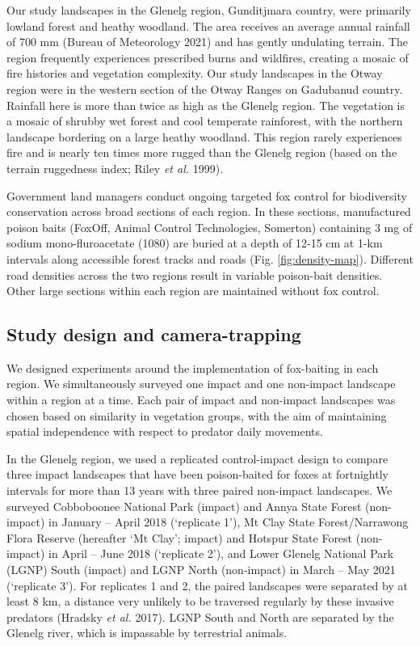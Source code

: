 \documentclass[11pt,a4paper,titlepage,twoside,openright]{style/unimelbthesis}
\begin{document}
\begin{mainmatter}
Our study landscapes in the Glenelg region, Gunditjmara country, were primarily lowland forest and heathy woodland. The area receives an average annual rainfall of 700 mm (Bureau of Meteorology 2021) and has gently undulating terrain. The region frequently experiences prescribed burns and wildfires, creating a mosaic of fire histories and vegetation complexity. Our study landscapes in the Otway region were in the western section of the Otway Ranges on Gadubanud country. Rainfall here is more than twice as high as the Glenelg region. The vegetation is a mosaic of shrubby wet forest and cool temperate rainforest, with the northern landscape bordering on a large heathy woodland. This region rarely experiences fire and is nearly ten times more rugged than the Glenelg region (based on the terrain ruggedness index; Riley \emph{et al.} 1999).

Government land managers conduct ongoing targeted fox control for biodiversity conservation across broad sections of each region. In these sections, manufactured poison baits (FoxOff, Animal Control Technologies, Somerton) containing 3 mg of sodium mono-fluroacetate (1080) are buried at a depth of 12-15 cm at 1-km intervals along accessible forest tracks and roads (Fig. \ref{fig:density-map}). Different road densities across the two regions result in variable poison-bait densities. Other large sections within each region are maintained without fox control.

\hypertarget{study-design-and-camera-trapping}{%
\subsection{Study design and camera-trapping}\label{study-design-and-camera-trapping}}

We designed experiments around the implementation of fox-baiting in each region. We simultaneously surveyed one impact and one non-impact landscape within a region at a time. Each pair of impact and non-impact landscapes was chosen based on similarity in vegetation groups, with the aim of maintaining spatial independence with respect to predator daily movements.

In the Glenelg region, we used a replicated control-impact design to compare three impact landscapes that have been poison-baited for foxes at fortnightly intervals for more than 13 years with three paired non-impact landscapes. We surveyed Cobboboonee National Park (impact) and Annya State Forest (non-impact) in January -- April 2018 (`replicate 1'), Mt Clay State Forest/Narrawong Flora Reserve (hereafter `Mt Clay'; impact) and Hotspur State Forest (non-impact) in April -- June 2018 (`replicate 2'), and Lower Glenelg National Park (LGNP) South (impact) and LGNP North (non-impact) in March -- May 2021 (`replicate 3'). For replicates 1 and 2, the paired landscapes were separated by at least 8 km, a distance very unlikely to be traversed regularly by these invasive predators (Hradsky \emph{et al.} 2017). LGNP South and North are separated by the Glenelg river, which is impassable by terrestrial animals.


\end{mainmatter}
\end{document}
